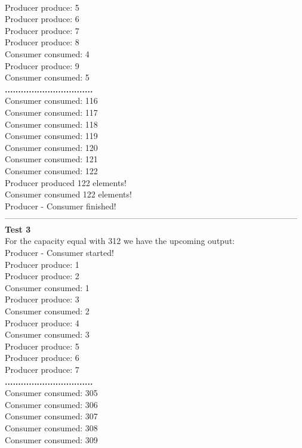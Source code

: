 \documentclass[14pt]{article}
\begin{document}
\\Producer produce: 5
\\Producer produce: 6
\\Producer produce: 7
\\Producer produce: 8
\\Consumer consumed: 4
\\Producer produce: 9
\\Consumer consumed: 5
\\\textbf{.................................}
\\Consumer consumed: 116
\\Consumer consumed: 117
\\Consumer consumed: 118
\\Consumer consumed: 119
\\Consumer consumed: 120
\\Consumer consumed: 121
\\Consumer consumed: 122
\\Producer produced 122 elements!
\\Consumer consumed 122 elements!
\\Producer - Consumer finished!
\\---------------------------------------------------------------------------------------------------------
\\\textbf{Test 3}
\\For the capacity equal with 312 we have the upcoming output:
\\Producer - Consumer started!
\\Producer produce: 1
\\Producer produce: 2
\\Consumer consumed: 1
\\Producer produce: 3
\\Consumer consumed: 2
\\Producer produce: 4
\\Consumer consumed: 3
\\Producer produce: 5
\\Producer produce: 6
\\Producer produce: 7
\\\textbf{.................................}
\\Consumer consumed: 305
\\Consumer consumed: 306
\\Consumer consumed: 307
\\Consumer consumed: 308
\\Consumer consumed: 309
\end{document}
